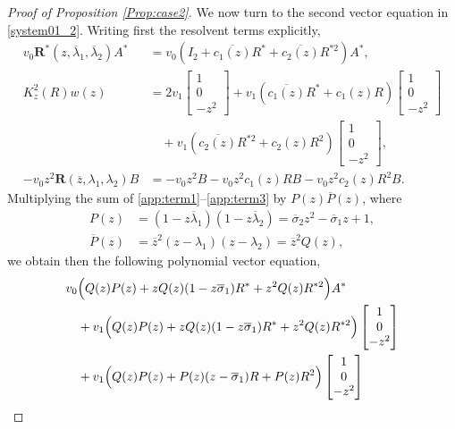 \documentclass[12pt, reqno]{amsart}
\theoremstyle{definition}
\theoremstyle{remark}
\numberwithin{equation}{section}
\begin{document}
\begin{proof}[Proof of Proposition \ref{Prop:case2}]
	We now turn to the second vector equation in \eqref{system01_2}. Writing first the resolvent terms explicitly,
	\begin{align}
		v_0\mathbf{R}^*(z, \overline{\lambda}_1, \overline{\lambda}_2)A^* &= v_0 \left( I_2 + \overline{c_1(z)} R^* + \overline{c_2(z)} R^{*2} \right) A^*, \label{app:term1} \\
		K_z^2(R) w(z) &= 2v_1 \begin{bmatrix} 1 \\ 0 \\ -z^2 \end{bmatrix} + v_1 \left( \overline{c_1(z)} R^* + c_1(z) R \right) \begin{bmatrix} 1 \\ 0 \\ -z^2 \end{bmatrix} \nonumber \\
		&\quad + v_1 \left( \overline{c_2(z)} R^{*2} + c_2(z) R^2 \right) \begin{bmatrix} 1 \\ 0 \\ -z^2 \end{bmatrix}, \label{app:term2} \\
		-v_0 z^2 \mathbf{R}(\overline{z}, \lambda_1, \lambda_2) B &= -v_0 z^2 B - v_0 z^2 c_1(z) R B - v_0 z^2 c_2(z) R^2 B. \label{app:term3}
	\end{align}
	Multiplying the sum of \eqref{app:term1}--\eqref{app:term3} by $P(z)\overline{P}(z)$, where
	\begin{align*}
		P(z) &= (1-z\overline{\lambda}_1)(1-z\overline{\lambda}_2) = \overline{\sigma}_2 z^2 - \overline{\sigma}_1 z + 1, \\
		\overline{P}(z) &= \overline{z}^2 (z-\lambda_1)(z-\lambda_2) = \overline{z}^2 Q(z),
	\end{align*}
we obtain then the following polynomial vector equation,
	\begin{align}\label{app:vector_cleared}
		v_0 &\Bigl( Q(z) P(z)  +  zQ(z) (1 - z\overline{\sigma}_1) R^*  +  z^2Q(z) R^{*2}\Bigr)   A^* \nonumber \\
		&+ v_1 \Bigl( Q(z) P(z)  +  zQ(z) (1 - z\overline{\sigma}_1) R^*  +  z^2Q(z) R^{*2}\Bigr)  \begin{bmatrix} 1 \\ 0 \\ -z^2 \end{bmatrix} \\
		&+ v_1 \Bigl( Q(z) P(z)+ P(z) (z - \overline{\sigma}_1) R +P(z) R^2 \Bigr)  \begin{bmatrix} 1 \\ 0 \\ -z^2 \end{bmatrix} \nonumber \\

\end{align}
\end{proof}
\end{document}
